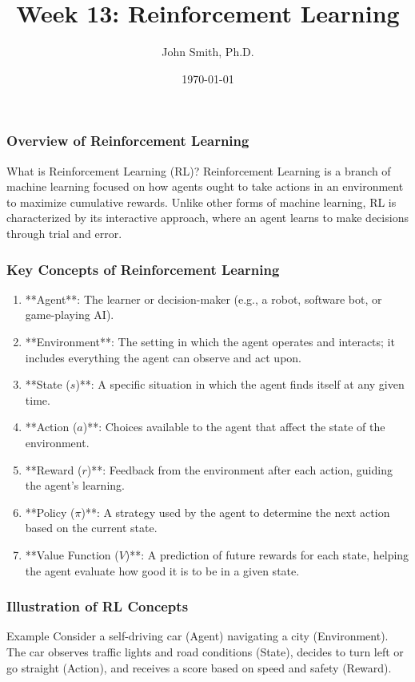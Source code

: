 \documentclass[aspectratio=169]{beamer}
\title[Week 13: Reinforcement Learning]{Week 13: Reinforcement Learning}
\author[J. Smith]{John Smith, Ph.D.}
\institute[University Name]{
  Department of Computer Science\\
  University Name\\
  \vspace{0.3cm}
  Email: email@university.edu\\
  Website: www.university.edu
}
\date{\today}
\begin{document}
\frame{\titlepage}

\begin{frame}[fragile]
  \titlepage
\end{frame}

\begin{frame}[fragile]
  \frametitle{Overview of Reinforcement Learning}
  
  \begin{block}{What is Reinforcement Learning (RL)?}
    Reinforcement Learning is a branch of machine learning focused on how agents ought to take actions in an environment to maximize cumulative rewards.
    Unlike other forms of machine learning, RL is characterized by its interactive approach, where an agent learns to make decisions through trial and error.
  \end{block}

\end{frame}

\begin{frame}[fragile]
  \frametitle{Key Concepts of Reinforcement Learning}

  \begin{enumerate}
    \item **Agent**: The learner or decision-maker (e.g., a robot, software bot, or game-playing AI).
    \item **Environment**: The setting in which the agent operates and interacts; it includes everything the agent can observe and act upon.
    \item **State ($s$)**: A specific situation in which the agent finds itself at any given time.
    \item **Action ($a$)**: Choices available to the agent that affect the state of the environment. 
    \item **Reward ($r$)**: Feedback from the environment after each action, guiding the agent's learning.
    \item **Policy ($\pi$)**: A strategy used by the agent to determine the next action based on the current state.
    \item **Value Function ($V$)**: A prediction of future rewards for each state, helping the agent evaluate how good it is to be in a given state.
  \end{enumerate}

\end{frame}

\begin{frame}[fragile]
  \frametitle{Illustration of RL Concepts}

  \begin{block}{Example}
    Consider a self-driving car (Agent) navigating a city (Environment). 
    The car observes traffic lights and road conditions (State), 
    decides to turn left or go straight (Action), 
    and receives a score based on speed and safety (Reward).
  \end{block}
  
\end{frame}
\end{document}
